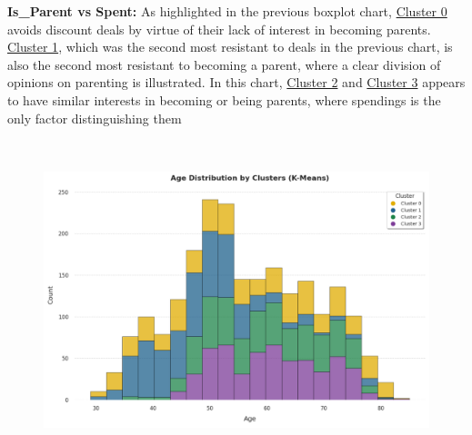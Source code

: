 \documentclass[11pt]{article}
\begin{document}
	\textbf{Is\_Parent vs Spent:} As highlighted in the previous boxplot chart, \uline{\textcolor[HTML]{BF9000}{Cluster 0}} avoids discount deals by virtue of their lack of interest in becoming parents. \uline{\textcolor[HTML]{1155CC}{Cluster 1}}, which was the second most resistant to deals in the previous chart, is also the second most resistant to becoming a parent, where a clear division of opinions on parenting is illustrated. In this chart, \uline{\textcolor[HTML]{38761D}{Cluster 2}} and \uline{\textcolor[HTML]{674EA7}{Cluster 3}} appears to have similar interests in becoming or being parents, where spendings is the only factor distinguishing them

\vspace{6\baselineskip}
\begin{figure}[H]
\centering
\includegraphics[width=13.99cm,height=9.3cm]{./images/image12.png}
\end{figure}
\end{document}
